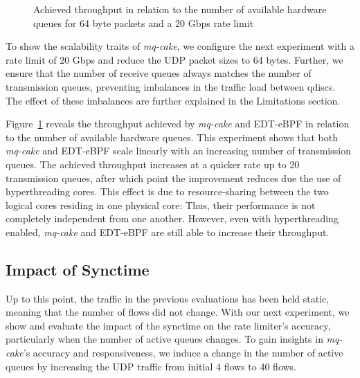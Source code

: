 \begin{figure}[h]
    \centering
    
    \caption{Achieved throughput in relation to the number of available hardware queues for 64 byte packets and a 20 Gbps rate limit}\label{fig:scaling}
\end{figure}
To show the scalability traits of \textit{mq-cake}, we configure the next experiment with a rate limit of 20 Gbps and reduce the UDP packet sizes to 64 bytes.
%
Further, we ensure that the number of receive queues always matches the number of transmission queues, preventing imbalances in the traffic load between qdiscs.
%
The effect of these imbalances are further explained in the Limitations section.
%

Figure~\ref{fig:scaling} reveals the throughput achieved by \textit{mq-cake} and EDT-eBPF in relation to the number of available hardware queues.
%
This experiment shows that both \textit{mq-cake} and EDT-eBPF scale linearly with an increasing number of transmission queues.
%
The achieved throughput increases at a quicker rate up to 20 transmission queues, after which point the improvement reduces due the use of hyperthreading cores.
%
This effect is due to resource-sharing between the two logical cores residing in one physical core:
%
Thus, their performance is not completely independent from one another.
%
However, even with hyperthreading enabled, \textit{mq-cake} and EDT-eBPF are still able to increase their throughput.

\subsection{Impact of Synctime}\label{sec:synchronization-time}
Up to this point, the traffic in the previous evaluations has been held static, meaning that the number of flows did not change.
%
With our next experiment, we show and evaluate the impact of the synctime on the rate limiter's accuracy, particularly when the number of active queues changes.
%
To gain insights in \textit{mq-cake}'s accuracy and responsiveness, we induce a change in the number of active queues by increasing the UDP traffic from initial 4 flows to 40 flows.
%

